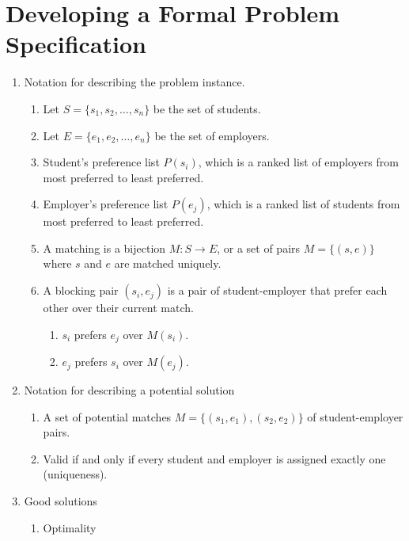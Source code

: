 \documentclass[12pt]{article}
\begin{document}
\section{Developing a Formal Problem Specification}
   \begin{enumerate}
    \item Notation for describing the problem instance.
        \begin{enumerate}
            \item Let $S = \{s_1, s_2, \ldots, s_n\}$ 
            be the set of students.
            \item Let $E = \{e_1, e_2, \ldots, e_n\}$ be 
            the set of employers.
            \item Student's preference list $P(s_i)$, which is a ranked 
            list of employers from most preferred to least preferred.
            \item Employer's preference list $P(e_j)$, which is a ranked
            list of students from most preferred to least preferred.
            \item A matching is a bijection $M : S \rightarrow E$, or a set of pairs $M = \{(s, e)\}$ where $s$ and $e$ 
            are matched uniquely.
            \item A blocking pair $(s_i, e_j)$ is a pair of
             student-employer that prefer each other over their current match.
                \begin{enumerate}
                    \item $s_i$ prefers $e_j$ over $M(s_i)$.
                    \item $e_j$ prefers $s_i$ over $M(e_j)$.
                \end{enumerate}
        \end{enumerate}
    \item Notation for describing a potential solution
        \begin{enumerate}
            \item A set of potential matches $M = \{(s_1, e_1), (s_2, e_2)\}$ 
            of student-employer pairs.
            \item Valid if and only if every student and employer is assigned exactly one (uniqueness).
        \end{enumerate}
    \item Good solutions
        \begin{enumerate}
            \item Optimality
                \begin{enumerate}

\end{enumerate}
\end{enumerate}
\end{enumerate}
\end{document}
